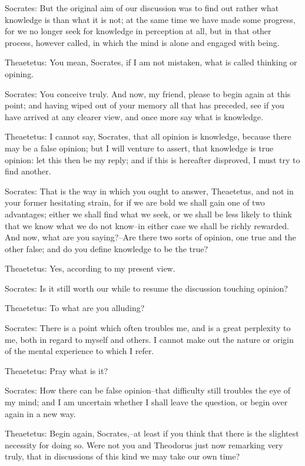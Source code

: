 Socrates: But the original aim of our discussion was to find out rather
what knowledge is than what it is not; at the same time we have made
some progress, for we no longer seek for knowledge in perception at all,
but in that other process, however called, in which the mind is alone
and engaged with being.

Theaetetus: You mean, Socrates, if I am not mistaken, what is called
thinking or opining.

Socrates: You conceive truly. And now, my friend, please to begin
again at this point; and having wiped out of your memory all that has
preceded, see if you have arrived at any clearer view, and once more say
what is knowledge.

Theaetetus: I cannot say, Socrates, that all opinion is knowledge,
because there may be a false opinion; but I will venture to assert, that
knowledge is true opinion: let this then be my reply; and if this is
hereafter disproved, I must try to find another.

Socrates: That is the way in which you ought to answer, Theaetetus, and
not in your former hesitating strain, for if we are bold we shall gain
one of two advantages; either we shall find what we seek, or we shall be
less likely to think that we know what we do not know--in either case we
shall be richly rewarded. And now, what are you saying?--Are there
two sorts of opinion, one true and the other false; and do you define
knowledge to be the true?

Theaetetus: Yes, according to my present view.

Socrates: Is it still worth our while to resume the discussion touching
opinion?

Theaetetus: To what are you alluding?

Socrates: There is a point which often troubles me, and is a great
perplexity to me, both in regard to myself and others. I cannot make out
the nature or origin of the mental experience to which I refer.

Theaetetus: Pray what is it?

Socrates: How there can be false opinion--that difficulty still troubles
the eye of my mind; and I am uncertain whether I shall leave the
question, or begin over again in a new way.

Theaetetus: Begin again, Socrates,--at least if you think that there is
the slightest necessity for doing so. Were not you and Theodorus just
now remarking very truly, that in discussions of this kind we may take
our own time?

